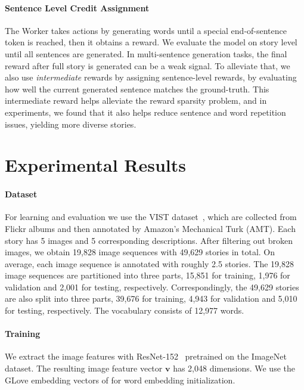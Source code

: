 \documentclass[letterpaper]{article} \usepackage{aaai19}  \usepackage{times}  \usepackage{helvet}  \usepackage{courier}  \usepackage{url}  \usepackage{graphicx}
\newcommand{\vv}{{\boldsymbol v}}
\begin{document}
\paragraph{Sentence Level Credit Assignment}
The Worker takes actions by generating words until a special end-of-sentence token is reached, then it obtains a reward. We evaluate the model on story level until all sentences are generated.  
In multi-sentence generation tasks, the final reward after full story is generated can be a weak signal. To alleviate that, we also use \emph{intermediate} rewards by assigning sentence-level rewards, by evaluating how well the current generated sentence matches the ground-truth. 
This intermediate reward helps alleviate the reward sparsity problem, and in experiments, we found that it also helps reduce sentence and word repetition issues, yielding more diverse stories.

\section{Experimental Results}
\label{sec:ExperimentalResults}
\paragraph{Dataset}\label{subsec:Dataset}
For learning and evaluation we use the VIST dataset~\cite{huang2016visual}, which are collected from Flickr albums and then annotated by Amazon's Mechanical Turk (AMT). Each story has 5 images and 5 corresponding descriptions. After filtering out broken images, we obtain 19,828 image sequences with 49,629 stories in total. On average, each image sequence is annotated with roughly 2.5 stories. The 19,828 image sequences are partitioned into three parts, 15,851 for training, 1,976 for validation and 2,001 for testing, respectively. Correspondingly, the 49,629 stories are also split into three parts, 39,676 for training, 4,943 for validation and 5,010 for testing, respectively. The vocabulary consists of 12,977 words. 


\paragraph{Training}\label{subsec:Training}
We extract the image features with ResNet-152~\cite{he2016deep} pretrained on the
ImageNet dataset. The resulting image feature vector $\vv$ has 2,048 dimensions.
We use the GLove embedding vectors of \cite{pennington2014glove} for word embedding initialization.
\end{document}
